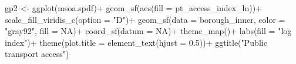 \documentclass[
  letterpaper,
  DIV=11,
  numbers=noendperiod]{scrreprt}
\newenvironment{Shaded}{\begin{snugshade}}{\end{snugshade}}
\newcommand{\AttributeTok}[1]{\textcolor[rgb]{0.40,0.45,0.13}{#1}}
\newcommand{\ConstantTok}[1]{\textcolor[rgb]{0.56,0.35,0.01}{#1}}
\newcommand{\FloatTok}[1]{\textcolor[rgb]{0.68,0.00,0.00}{#1}}
\newcommand{\FunctionTok}[1]{\textcolor[rgb]{0.28,0.35,0.67}{#1}}
\newcommand{\NormalTok}[1]{\textcolor[rgb]{0.00,0.23,0.31}{#1}}
\newcommand{\OtherTok}[1]{\textcolor[rgb]{0.00,0.23,0.31}{#1}}
\newcommand{\SpecialCharTok}[1]{\textcolor[rgb]{0.37,0.37,0.37}{#1}}
\newcommand{\StringTok}[1]{\textcolor[rgb]{0.13,0.47,0.30}{#1}}
\begin{document}
\begin{Shaded}
\begin{Highlighting}[]
\NormalTok{gp2 }\OtherTok{\textless{}{-}} \FunctionTok{ggplot}\NormalTok{(msoa.spdf)}\SpecialCharTok{+}
  \FunctionTok{geom\_sf}\NormalTok{(}\FunctionTok{aes}\NormalTok{(}\AttributeTok{fill =}\NormalTok{ pt\_access\_index\_ln))}\SpecialCharTok{+}
  \FunctionTok{scale\_fill\_viridis\_c}\NormalTok{(}\AttributeTok{option =} \StringTok{"D"}\NormalTok{)}\SpecialCharTok{+}
  \FunctionTok{geom\_sf}\NormalTok{(}\AttributeTok{data =}\NormalTok{ borough\_inner, }\AttributeTok{color =} \StringTok{"gray92"}\NormalTok{, }\AttributeTok{fill =} \ConstantTok{NA}\NormalTok{)}\SpecialCharTok{+}
  \FunctionTok{coord\_sf}\NormalTok{(}\AttributeTok{datum =} \ConstantTok{NA}\NormalTok{)}\SpecialCharTok{+}
  \FunctionTok{theme\_map}\NormalTok{()}\SpecialCharTok{+}
  \FunctionTok{labs}\NormalTok{(}\AttributeTok{fill =} \StringTok{"log index"}\NormalTok{)}\SpecialCharTok{+}
  \FunctionTok{theme}\NormalTok{(}\AttributeTok{plot.title =} \FunctionTok{element\_text}\NormalTok{(}\AttributeTok{hjust =} \FloatTok{0.5}\NormalTok{))}\SpecialCharTok{+}
  \FunctionTok{ggtitle}\NormalTok{(}\StringTok{"Public transport access"}\NormalTok{)}
\end{Highlighting}
\end{Shaded}
\end{document}
